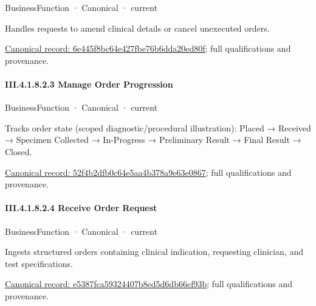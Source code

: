 \label{element:6e445f8bc64e427fbe76b6dda20ed80f}
{\small BusinessFunction · Canonical · current}\par

Handles requests to amend clinical details or cancel unexecuted orders.


{\footnotesize \href{../../../../../../../continuum/business/business-function/6e445f8bc64e427fbe76b6dda20ed80f.md}{Canonical record: 6e445f8bc64e427fbe76b6dda20ed80f}; full qualifications and provenance.}\par
\paragraph*{III.4.1.8.2.3 Manage Order Progression}
\label{navigation:III.4.1.8.2.3}

\label{element:52f4b2dfb0c64e5aa4b378a9e63e0867}
{\small BusinessFunction · Canonical · current}\par

Tracks order state (scoped diagnostic/procedural illustration): Placed → Received → Specimen Collected → In-Progress → Preliminary Result → Final Result → Closed.


{\footnotesize \href{../../../../../../../continuum/business/business-function/52f4b2dfb0c64e5aa4b378a9e63e0867.md}{Canonical record: 52f4b2dfb0c64e5aa4b378a9e63e0867}; full qualifications and provenance.}\par
\paragraph*{III.4.1.8.2.4 Receive Order Request}
\label{navigation:III.4.1.8.2.4}

\label{element:e5387fca59324407b8ed5d6db66ef93b}
{\small BusinessFunction · Canonical · current}\par

Ingests structured orders containing clinical indication, requesting clinician, and test specifications.


{\footnotesize \href{../../../../../../../continuum/business/business-function/e5387fca59324407b8ed5d6db66ef93b.md}{Canonical record: e5387fca59324407b8ed5d6db66ef93b}; full qualifications and provenance.}\par
